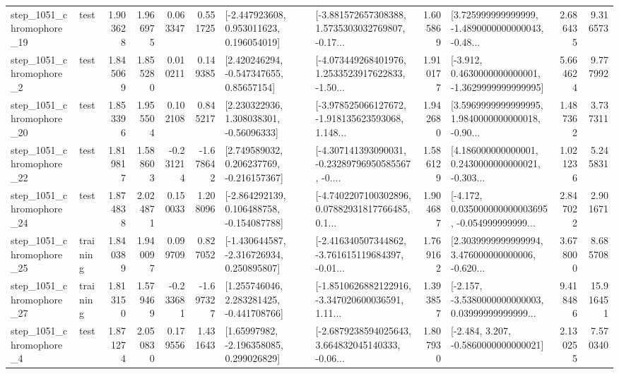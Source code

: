 \begin{tabular}{llrrrrllrlrr}
 step\_1051\_chromophore\_19 &      test &      1.903628 &    1.966975 &      0.063347 &  0.551725 &    [-2.447923608, 0.953011623, 0.196054019] &  [-3.881572657308388, 1.5735303032769807, -0.17... &       1.605869 &  [3.725999999999999, -1.4890000000000043, -0.48... &            2.686435 &          9.316573 \\
  step\_1051\_chromophore\_2 &      test &      1.845069 &    1.855280 &      0.010211 &  0.149385 &     [2.420246294, -0.547347655, 0.85657154] &  [-4.073449268401976, 1.2533523917622833, -1.50... &       1.910177 &  [-3.912, 0.4630000000000001, -1.3629999999999995] &            5.664624 &          9.777992 \\
 step\_1051\_chromophore\_20 &      test &      1.853396 &    1.955504 &      0.102108 &  0.845217 &     [2.230322936, 1.308038301, -0.56096333] &  [-3.978525066127672, -1.918135623593068, 1.148... &       1.942680 &  [3.5969999999999995, 1.9840000000000018, -0.90... &            1.487362 &          3.737311 \\
 step\_1051\_chromophore\_22 &      test &      1.819817 &    1.588603 &     -0.231214 & -1.678642 &    [2.749589032, 0.206237769, -0.216157367] &  [-4.307141393090031, -0.23289796950585567, -0.... &       1.586129 &  [4.186000000000001, 0.2430000000000021, -0.303... &            1.021236 &          5.245831 \\
 step\_1051\_chromophore\_24 &      test &      1.874838 &    2.024871 &      0.150033 &  1.208096 &   [-2.864292139, 0.106488758, -0.154087788] &  [-4.7402207100302896, 0.07882931817766485, 0.1... &       1.904687 &  [-4.172, 0.035000000000003695, -0.054999999999... &            2.847022 &          2.901671 \\
 step\_1051\_chromophore\_25 &  training &      1.840389 &    1.940097 &      0.099709 &  0.827052 &   [-1.430644587, -2.316726934, 0.250895807] &  [-2.416340507344862, -3.761615119684397, -0.01... &       1.769162 &  [2.3039999999999994, 3.476000000000006, -0.620... &            3.678000 &          8.685708 \\
 step\_1051\_chromophore\_27 &  training &      1.813150 &    1.579469 &     -0.233681 & -1.697327 &    [1.255746046, 2.283281425, -0.441708766] &  [-1.8510626882122916, -3.347020600036591, 1.11... &       1.393857 &  [-2.157, -3.5380000000000003, 0.03999999999999... &            9.418486 &         15.916451 \\
  step\_1051\_chromophore\_4 &      test &      1.871274 &    2.050830 &      0.179556 &  1.431643 &     [1.65997982, -2.196358085, 0.299026829] &  [-2.6879238594025643, 3.664832045140333, -0.06... &       1.807930 &               [-2.484, 3.207, -0.5860000000000021] &            2.130255 &          7.570340 \\

\end{tabular}
